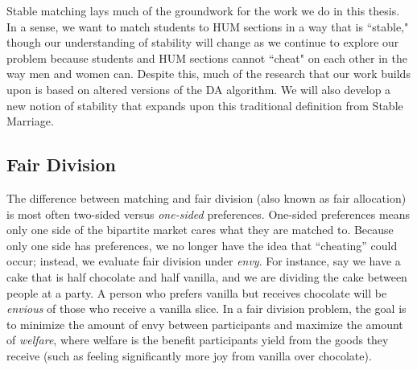 Stable matching lays much of the groundwork for the work we do in this thesis.
In a sense, we want to match students to HUM sections in a way that is ``stable,"
though our understanding of stability will change as we continue to explore our
problem because students and HUM sections cannot ``cheat" on each other in the way
men and women can. Despite this, much of the research that our work builds upon is
based on altered versions of the DA algorithm. We will also develop a new notion
of stability that expands upon this traditional definition from Stable Marriage.

\subsection{Fair Division}

The difference between matching and fair division (also known as fair
allocation) is most often two-sided versus \textit{one-sided} preferences. One-sided
preferences means only one side of the bipartite market cares what they
are matched to. Because only one side has preferences, we no longer have the idea that
“cheating” could occur; instead, we evaluate fair division under \textit{envy}.
For instance, say we have a cake that is half chocolate and half vanilla, and we are dividing
the cake between people at a party. A person who prefers vanilla but receives
chocolate will be \textit{envious} of those who receive a vanilla slice. In a
fair division problem, the goal is to minimize the amount of envy between
participants and maximize the amount of \textit{welfare}, where welfare is the
benefit participants yield from the goods they receive (such as feeling
significantly more joy from vanilla over chocolate).

